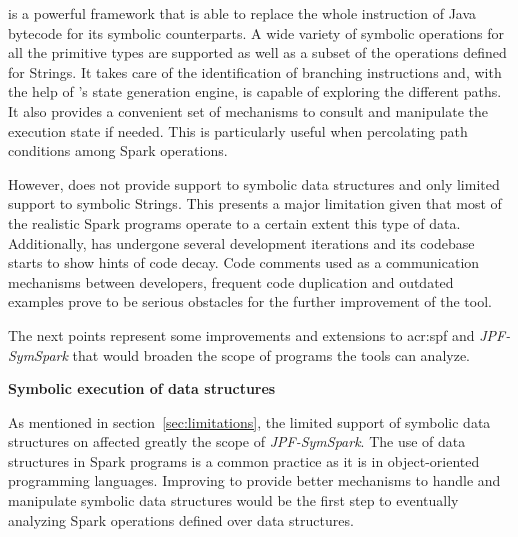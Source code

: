 \begin{enumerate}
	\spf{} is a powerful framework that is able to replace the whole instruction of Java bytecode for its symbolic counterparts. A wide variety of symbolic operations for all the primitive types are supported as well as a subset of the operations defined for Strings. It takes care of the identification of branching instructions and, with the help of \jpf{}'s state generation engine, is capable of exploring the different paths. It also provides a convenient set of mechanisms to consult and manipulate the execution state if needed. This is particularly useful when percolating path conditions among Spark operations. 
	
	However, \spf{} does not provide support to symbolic data structures and only limited support to symbolic Strings. This presents a major limitation given that most of the realistic Spark programs operate to a certain extent this type of data. Additionally, \spf{} has undergone several development iterations and its codebase starts to show hints of code decay. Code comments used as a communication mechanisms between developers, frequent code duplication and outdated examples prove to be serious obstacles for the further improvement of the tool.
	
\end{enumerate}

\label{sec:future}


The next points represent some improvements and extensions to \acrlong{acr:spf} and \textit{JPF-SymSpark} that would broaden the scope of programs the tools can analyze.

\textbf{Symbolic execution of data structures}

As mentioned in section~\ref{sec:limitations}, the limited support of symbolic data structures on \spf{} affected greatly the scope of \textit{JPF-SymSpark}. The use of data structures in Spark programs is a common practice as it is in object-oriented programming languages. Improving \spf{} to provide better mechanisms to handle and manipulate symbolic data structures would be the first step to eventually analyzing Spark operations defined over data structures.

